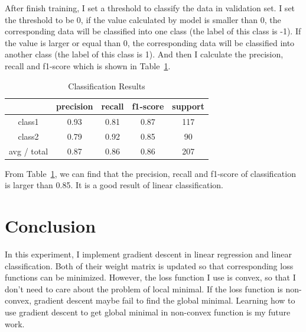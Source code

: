 \documentclass[journal, a4paper]{IEEEtran}
\begin{document}
After finish training, I set a threshold to classify the data in validation set. I set the threshold to be 0, if the value calculated by model is smaller than 0, the corresponding data will be classified into one class (the label of this class is -1). If the value is larger or equal than 0, the corresponding data will be classified into another class (the label of this class is 1). And then I calculate the precision, recall and f1-score which is shown in Table~\ref{table_1}.

    \begin{table}[!hbt]
		\begin{center}
		\caption{Classification Results}
		\label{table_1}
		\begin{tabular}{|c|c|c|c|c|}
			\hline
			  & precision & recall & f1-score & support \\
			\hline
			class1 & 0.93 & 0.81 & 0.87  & 117 \\
			\hline
			class2 & 0.79 & 0.92 & 0.85  & 90 \\
			\hline
			avg / total & 0.87 & 0.86 & 0.86 & 207 \\
			\hline
		\end{tabular}
		\end{center}
	\end{table}

From Table~\ref{table_1}, we can find that the precision, recall and f1-score of classification is larger than 0.85. It is a good result of linear classification.

\section{Conclusion}
In this experiment, I implement gradient descent in linear regression and linear classification. Both of their weight matrix is updated so that corresponding loss functions can be minimized. However, the loss function I use is convex, so that I don't need to care about the problem of local minimal. If the loss function is non-convex, gradient descent maybe fail to find the global minimal. Learning how to use gradient descent to get global minimal in non-convex function is my future work.

\end{document}
